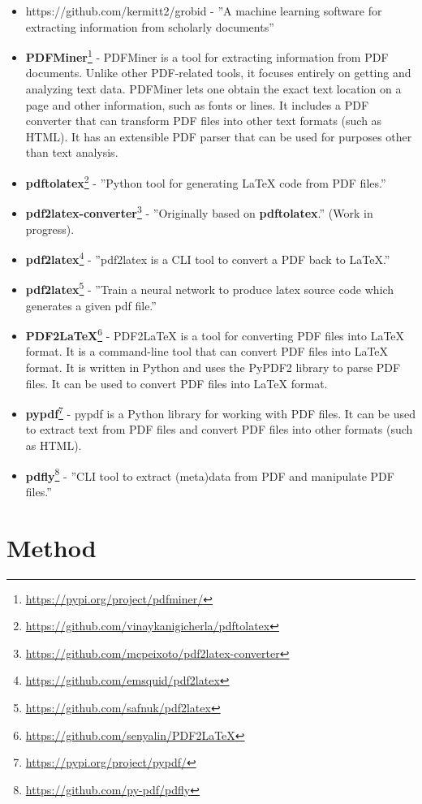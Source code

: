 \begin{itemize}
    \item https://github.com/kermitt2/grobid - ''A machine learning software for extracting information from scholarly documents''
    \item \textbf{PDFMiner}\footnote{\url{https://pypi.org/project/pdfminer/}} - PDFMiner is a tool for extracting information from PDF documents. Unlike other PDF-related tools, it focuses entirely on getting and analyzing text data. PDFMiner lets one obtain the exact text location on a page and other information, such as fonts or lines. It includes a PDF converter that can transform PDF files into other text formats (such as HTML). It has an extensible PDF parser that can be used for purposes other than text analysis.
    \item \textbf{pdftolatex}\footnote{\url{https://github.com/vinaykanigicherla/pdftolatex}} - ''Python tool for generating \LaTeX{} code from PDF files.''
    \item \textbf{pdf2latex-converter}\footnote{\url{https://github.com/mcpeixoto/pdf2latex-converter}} - ''Originally based on \textbf{pdftolatex}.'' (Work in progress).
    \item \textbf{pdf2latex}\footnote{\url{https://github.com/emsquid/pdf2latex}} - ''pdf2latex is a CLI tool to convert a PDF back to LaTeX.''
    \item \textbf{pdf2latex}\footnote{\url{https://github.com/safnuk/pdf2latex}} - ''Train a neural network to produce latex source code which generates a given pdf file.''
    \item \textbf{PDF2LaTeX}\footnote{\url{https://github.com/senyalin/PDF2LaTeX}} - PDF2LaTeX is a tool for converting PDF files into \LaTeX{} format. It is a command-line tool that can convert PDF files into \LaTeX{} format. It is written in Python and uses the PyPDF2 library to parse PDF files. It can be used to convert PDF files into \LaTeX{} format.
    \item \textbf{pypdf}\footnote{\url{https://pypi.org/project/pypdf/}} - pypdf is a Python library for working with PDF files. It can be used to extract text from PDF files and convert PDF files into other formats (such as HTML).
    \item \textbf{pdfly}\footnote{\url{https://github.com/py-pdf/pdfly}} - ''CLI tool to extract (meta)data from PDF and manipulate PDF files.''
\end{itemize}

\section{Method}

